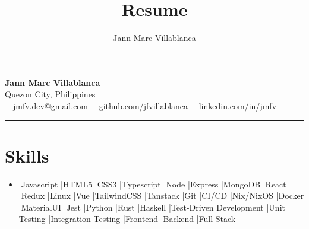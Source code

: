 \documentclass[11pt,letterpaper]{article}
\author{Jann Marc Villablanca}
\title{Resume}
\newenvironment{pipeseparateditemize}[1][]{
    \begin{itemize}[label={}, #1]
        \item
    \def\separator{}
    \def\item{\ifhmode \unskip\space|\space\fi\relax\ignorespaces\separator}
}{%
    \end{itemize}
}
\begin{document}
\begin{center}
	{\LARGE \textbf{Jann Marc Villablanca}}\\
	Quezon City, Philippines
	\vspace{0.05cm}
	\\
	\raisebox{-0.2\height}{\Large \faEnvelopeSquare} \ \ jmfv.dev@gmail.com \hfill \raisebox{-0.2\height}{\Large \faGithubSquare} \ \ github.com/jfvillablanca \hfill \raisebox{-0.2\height}{\Large \faLinkedinSquare} \ \ linkedin.com/in/jmfv
\end{center}

\hrule
\section*{\Large Skills}

\begin{pipeseparateditemize}[leftmargin=1em,noitemsep]
    \item Javascript
    \item HTML5
    \item CSS3
    \item Typescript
    \item Node
    \item Express
    \item MongoDB
    \item React
    \item Redux
    \item Linux
    \item Vue
    \item TailwindCSS
    \item Tanstack
    \item Git
    \item CI/CD
    \item Nix/NixOS
    \item Docker
    \item MaterialUI
    \item Jest
    \item Python
    \item Rust
    \item Haskell
    \item Test-Driven Development
    \item Unit Testing
    \item Integration Testing
    \item Frontend
    \item Backend
    \item Full-Stack
\end{pipeseparateditemize}
\end{document}
